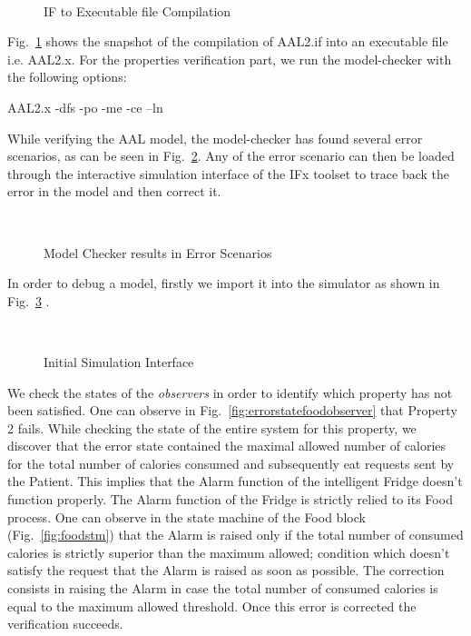 \documentclass[a4paper,twoside]{article}
\begin{document}
\begin{figure}[!h]
  \vspace{8cm}~
  \centering
  {}
  \caption{IF to Executable file Compilation}
  \label{fig:if2exe}
 \end{figure}
 
Fig.~\ref{fig:if2exe} shows the snapshot of the compilation of AAL2.if into an executable file i.e. AAL2.x. 
For the properties verification part, we run the model-checker with the following options:

AAL2.x -dfs -po -me -ce –ln

While verifying the AAL model, the model-checker has found several error scenarios, as can be seen in Fig.~\ref{fig:errorstate}.  Any of the error scenario can then be loaded through the interactive simulation interface of the IFx toolset to trace back the error in the model and then correct it. 

\begin{figure}[!h]
  \vspace{8cm}~
  \centering
  {}
  \caption{Model Checker results in Error Scenarios}
  \label{fig:errorstate}
 \end{figure}

In order to  debug  a model, firstly we import it into the simulator as shown in Fig.~\ref{fig:initialsimulationinterface} .

\begin{figure}[!h]
  \vspace{8cm}~
  \centering
  {}
  \caption{Initial Simulation Interface}
  \label{fig:initialsimulationinterface}
 \end{figure}

We check the states of the \textit{observers} in order to identify which property has not been satisfied. One can observe in Fig.~\ref{fig:errorstatefoodobserver} that Property 2 fails. While checking the state of the entire system for this property, we discover that the error state contained the maximal allowed number of calories for the total number of calories consumed and subsequently eat requests sent by the Patient. This implies that the Alarm function of the intelligent Fridge doesn't function properly. The Alarm function of the Fridge is strictly relied to its Food process. One can observe in the state machine of the Food block (Fig.~\ref{fig:foodstm}) that the Alarm is raised only if the total number of consumed calories is strictly superior than the maximum allowed; condition which doesn't satisfy the request that the Alarm is raised as soon as possible. The correction consists in raising the Alarm in case the total number of consumed calories is equal to the maximum allowed threshold. Once this error is corrected the verification succeeds.
\end{document}
